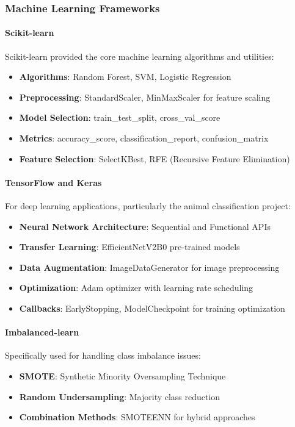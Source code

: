 \documentclass[12pt, a4paper]{article}
\begin{document}
\subsubsection{Machine Learning Frameworks}

\paragraph{Scikit-learn}
Scikit-learn provided the core machine learning algorithms and utilities:
\begin{itemize}
    \item \textbf{Algorithms}: Random Forest, SVM, Logistic Regression
    \item \textbf{Preprocessing}: StandardScaler, MinMaxScaler for feature scaling
    \item \textbf{Model Selection}: train\_test\_split, cross\_val\_score
    \item \textbf{Metrics}: accuracy\_score, classification\_report, confusion\_matrix
    \item \textbf{Feature Selection}: SelectKBest, RFE (Recursive Feature Elimination)
\end{itemize}

\paragraph{TensorFlow and Keras}
For deep learning applications, particularly the animal classification project:
\begin{itemize}
    \item \textbf{Neural Network Architecture}: Sequential and Functional APIs
    \item \textbf{Transfer Learning}: EfficientNetV2B0 pre-trained models
    \item \textbf{Data Augmentation}: ImageDataGenerator for image preprocessing
    \item \textbf{Optimization}: Adam optimizer with learning rate scheduling
    \item \textbf{Callbacks}: EarlyStopping, ModelCheckpoint for training optimization
\end{itemize}

\paragraph{Imbalanced-learn}
Specifically used for handling class imbalance issues:
\begin{itemize}
    \item \textbf{SMOTE}: Synthetic Minority Oversampling Technique
    \item \textbf{Random Undersampling}: Majority class reduction
    \item \textbf{Combination Methods}: SMOTEENN for hybrid approaches
\end{itemize}
\end{document}
